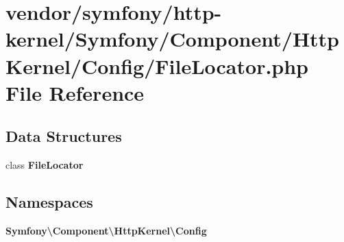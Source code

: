 \section{vendor/symfony/http-\/kernel/\+Symfony/\+Component/\+Http\+Kernel/\+Config/\+File\+Locator.php File Reference}
\label{_file_locator_8php}
\subsection*{Data Structures}
\begin{DoxyCompactItemize}
\item 
class {\bf File\+Locator}
\end{DoxyCompactItemize}
\subsection*{Namespaces}
\begin{DoxyCompactItemize}
\item 
 {\bf Symfony\textbackslash{}\+Component\textbackslash{}\+Http\+Kernel\textbackslash{}\+Config}
\end{DoxyCompactItemize}
